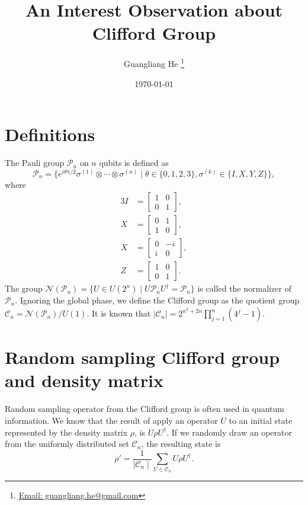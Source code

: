 \documentclass{article}
\title{An Interest Observation about Clifford Group}
\author{Guangliang He
  \thanks{\href{mailto:guangliang.he@gmail.com}
    {Email: guangliang.he@gmail.com}}}
\date{\today}
\begin{document}
\maketitle

\section{Definitions}
The Pauli group $\mathcal P_n$ on $n$ qubits is defined as
\begin{equation}
  \mathcal P_n = \{e^{i\theta\pi/2}\sigma^{(1)}\otimes\cdots\otimes\sigma^{(n)}
  \mid \theta\in\{0,1,2,3\}, \sigma^{(k)} \in \{I, X, Y, Z\}\},
\end{equation}
where
\begin{alignat}{3}
  I &= \begin{bmatrix} 1 & 0 \\ 0 & 1\end{bmatrix}, \\
  X &= \begin{bmatrix} 0 & 1 \\ 1 & 0\end{bmatrix}, \\
  X &= \begin{bmatrix} 0 & -i \\ i & 0\end{bmatrix}, \\
  Z &= \begin{bmatrix} 1 & 0 \\ 0 & 1\end{bmatrix}.
\end{alignat}
The group 
$\mathcal N(\mathcal P_n) = \{U\in U(2^n)\mid U\mathcal P_nU^\dagger
= \mathcal P_n\}$ is called the normalizer of $\mathcal P_n$.
Ignoring the global phase, we define the Clifford group as the quotient
group $\mathcal C_n = \mathcal N(\mathcal P_n)/U(1)$.
It is known that\cite{Koenig_2014}
$\mid\mathcal C_n\mid = 2^{n^2+2n}\prod_{j=1}^n(4^j-1)$.

\section{Random sampling Clifford group and density matrix}
Random sampling operator from the Clifford group is often used in quantum
information.  We know that the result of apply an operator $U$ to an
initial state represented by the density matrix $\rho$, is
$U\rho U^\dagger$.  If we randomly draw an operator from the uniformly
distributed set $\mathcal C_n$, the resulting state is
\begin{equation}
  \label{eq:rho_prime}
  \rho' = \frac{1}{\mid\mathcal C_n\mid}\sum_{U\in\mathcal C_n}U\rho U^\dagger.
\end{equation}
\end{document}
